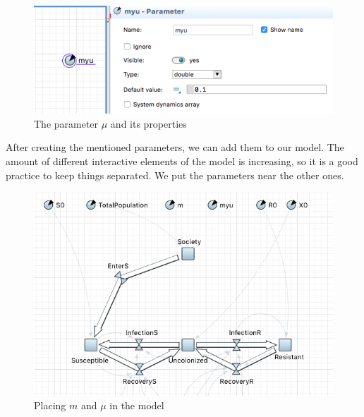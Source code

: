 \begin{figure}[H]
  \centering
  \includegraphics[height=0.5\textwidth]{img/screens/society/society6}
  \caption{The parameter $\mu$ and its properties}
\end{figure}

After creating the mentioned parameters, we can add them to our model. The amount of different interactive elements of the model is increasing, so it is a good practice to keep things separated. We put the parameters near the other ones.

\begin{figure}[H]
  \centering
  \includegraphics[height=0.3\textwidth]{img/screens/society/society5}
  \caption{Placing $m$ and $\mu$ in the model}
\end{figure}
